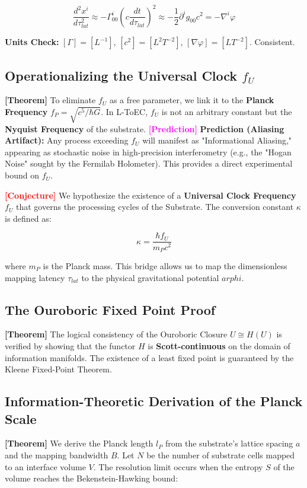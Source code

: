 \documentclass[11pt,titlepage]{article}
\newcommand{\tagtheo}{\textcolor{green!60!black}{\textbf{[Theorem]}} }
\newcommand{\tagconj}{\textcolor{red}{\textbf{[Conjecture]}} }
\newcommand{\tagpred}{\textcolor{magenta}{\textbf{[Prediction]}} }
\begin{document}
\begin{equation}
\frac{d^2 x^i}{d\tau_{lat}^2} \approx -\Gamma^i_{00} (c \frac{dt}{d\tau_{lat}})^2 \approx -\frac{1}{2} \partial^i g_{00} c^2 = -\nabla^i \varphi
\end{equation}

\textbf{Units Check:} $[\Gamma] = [L^{-1}]$, $[c^2] = [L^2 T^{-2}]$, $[\nabla \varphi] = [L T^{-2}]$. Consistent.


\subsection{Operationalizing the Universal Clock $f_U$}
\tagtheo To eliminate $f_U$ as a free parameter, we link it to the \textbf{Planck Frequency} $f_P = \sqrt{c^5 / \hbar G}$. In L-ToEC, $f_U$ is not an arbitrary constant but the \textbf{Nyquist Frequency} of the substrate. 
\tagpred \textbf{Prediction (Aliasing Artifact):} Any process exceeding $f_U$ will manifest as "Informational Aliasing," appearing as stochastic noise in high-precision interferometry (e.g., the "Hogan Noise" sought by the Fermilab Holometer). This provides a direct experimental bound on $f_U$.

\tagconj We hypothesize the existence of a \textbf{Universal Clock Frequency} $f_U$ that governs the processing cycles of the Substrate. The conversion constant $\kappa$ is defined as:

\begin{equation}
\kappa = \frac{\hbar f_U}{m_P c^2}
\end{equation}

where $m_P$ is the Planck mass. This bridge allows us to map the dimensionless mapping latency $\tau_{lat}$ to the physical gravitational potential $arphi$.

\subsection{The Ouroboric Fixed Point Proof}
\tagtheo The logical consistency of the Ouroboric Closure $U \cong H(U)$ is verified by showing that the functor $H$ is \textbf{Scott-continuous} on the domain of information manifolds. The existence of a least fixed point is guaranteed by the Kleene Fixed-Point Theorem.

\subsection{Information-Theoretic Derivation of the Planck Scale}
\tagtheo We derive the Planck length $l_P$ from the substrate's lattice spacing $a$ and the mapping bandwidth $B$. Let $N$ be the number of substrate cells mapped to an interface volume $V$. The resolution limit occurs when the entropy $S$ of the volume reaches the Bekenstein-Hawking bound:
\end{document}
